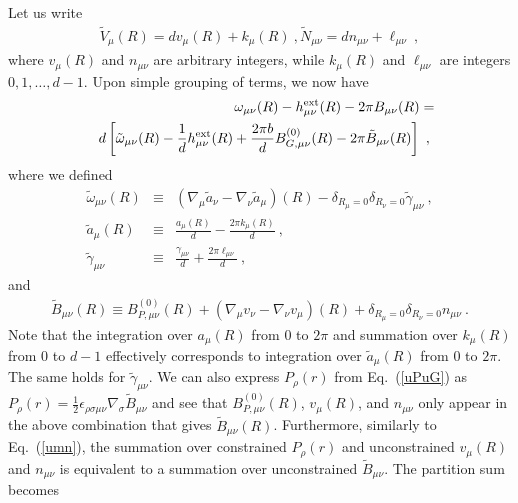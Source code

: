 \documentclass[prb,twocolumn]{revtex4-1}
\def\cP{{P}}
\def\hext{h^{\rm ext}}
\def\uu{B}
\def\MM{N}
\def\mm{n}
\begin{document}
Let us write
\begin{eqnarray}
\tilde{V}_\mu(R) = d v_\mu(R) + k_\mu(R) ~,
\tilde{\MM}_{\mu\nu} = d \mm_{\mu\nu} + \ell_{\mu\nu} ~,
\end{eqnarray}
where $v_\mu(R)$ and $\mm_{\mu\nu}$ are arbitrary integers, while $k_\mu(R)$ and $\ell_{\mu\nu}$ are integers $0, 1, \dots, d-1$. 
Upon simple grouping of terms, we now have
\begin{eqnarray}
&& \omega_{\mu\nu}(R) - \hext_{\mu\nu}(R) - 2\pi \uu_{\mu\nu}(R) = \\
&& d \left[\tilde{\omega}_{\mu\nu}(R) - \frac{1}{d} \hext_{\mu\nu}(R) + \frac{2\pi b}{d} \uu_{G, \mu\nu}^{(0)}(R) - 2\pi \tilde{\uu}_{\mu\nu}(R) \right] ~,~\nonumber
\end{eqnarray}
where we defined
\begin{eqnarray}
\tilde{\omega}_{\mu\nu}(R) &\equiv& (\nabla_\mu \tilde{a}_\nu - \nabla_\nu \tilde{a}_\mu)(R) - \delta_{R_\mu = 0} \delta_{R_\nu = 0} \tilde{\gamma}_{\mu\nu} ~,\nonumber \\
\tilde{a}_\mu(R) &\equiv& \frac{a_\mu(R)}{d} - \frac{2\pi k_\mu(R)}{d} ~,\label{atilde} \\
\tilde{\gamma}_{\mu\nu} &\equiv& \frac{\gamma_{\mu\nu}}{d} + \frac{2\pi \ell_{\mu\nu}}{d} ~,\nonumber
\end{eqnarray}
and
\begin{eqnarray}
\tilde{\uu}_{\mu\nu}(R) \equiv \uu_{P, \mu\nu}^{(0)}(R) + (\nabla_\mu v_\nu - \nabla_\nu v_\mu)(R) + \delta_{R_\mu = 0} \delta_{R_\nu = 0} \mm_{\mu\nu} ~.\nonumber
\end{eqnarray}
Note that the integration over $a_\mu(R)$ from $0$ to $2\pi$ and summation over $k_\mu(R)$ from $0$ to $d-1$ effectively corresponds to integration over $\tilde{a}_{\mu}(R)$ from $0$ to $2\pi$.  The same holds for $\tilde{\gamma}_{\mu\nu}$.
We can also express $\cP_\rho(r)$ from Eq.~(\ref{uPuG}) as $\cP_\rho(r) = \frac{1}{2} \epsilon_{\rho\sigma\mu\nu} \nabla_\sigma \tilde{\uu}_{\mu\nu}$ and see that $\uu_{P, \mu\nu}^{(0)}(R)$, $v_\mu(R)$, and $\mm_{\mu\nu}$ only appear in the above combination that gives $\tilde{\uu}_{\mu\nu}(R)$.  Furthermore, similarly to Eq.~(\ref{umn}), the summation over constrained $\cP_\rho(r)$ and unconstrained $v_\mu(R)$ and $\mm_{\mu\nu}$ is equivalent to a summation over unconstrained $\tilde{\uu}_{\mu\nu}$.  The partition sum becomes
\end{document}
